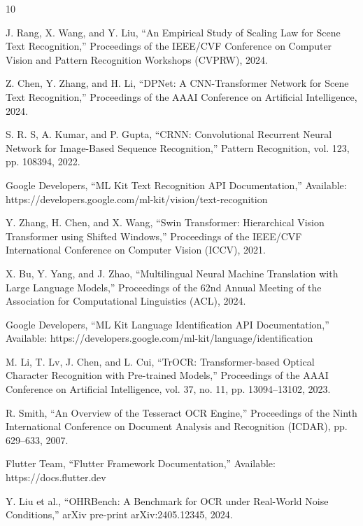 \documentclass[12pt,a4paper]{report}
\begin{document}
\renewcommand{\bibname}{References}
\begin{thebibliography}{10}

J. Rang, X. Wang, and Y. Liu,
``An Empirical Study of Scaling Law for Scene Text Recognition,''
Proceedings of the IEEE/CVF Conference on Computer Vision and
Pattern Recognition Workshops (CVPRW), 2024.

Z. Chen, Y. Zhang, and H. Li,
``DPNet: A CNN-Transformer Network for Scene Text Recognition,''
Proceedings of the AAAI Conference on Artificial Intelligence, 2024.

S. R. S, A. Kumar, and P. Gupta,
``CRNN: Convolutional Recurrent Neural Network for Image-Based Sequence Recognition,''
Pattern Recognition, vol. 123, pp. 108394, 2022.

Google Developers,
``ML Kit Text Recognition API Documentation,''
Available: https://developers.google.com/ml-kit/vision/text-recognition

Y. Zhang, H. Chen, and X. Wang,
``Swin Transformer: Hierarchical Vision Transformer using Shifted Windows,''
Proceedings of the IEEE/CVF International Conference on Computer Vision (ICCV), 2021.

X. Bu, Y. Yang, and J. Zhao,
``Multilingual Neural Machine Translation with Large Language Models,''
Proceedings of the 62nd Annual Meeting of the Association for Computational Linguistics (ACL), 2024.

Google Developers,
``ML Kit Language Identification API Documentation,''
Available: https://developers.google.com/ml-kit/language/identification

M. Li, T. Lv, J. Chen, and L. Cui,
``TrOCR: Transformer-based Optical Character Recognition with Pre-trained Models,''
Proceedings of the AAAI Conference on Artificial Intelligence,
vol. 37, no. 11, pp. 13094--13102, 2023.

R. Smith,
``An Overview of the Tesseract OCR Engine,''
Proceedings of the Ninth International Conference on Document Analysis and Recognition (ICDAR),
pp. 629--633, 2007.

Flutter Team,
``Flutter Framework Documentation,''
Available: https://docs.flutter.dev

Y. Liu et al.,
``OHRBench: A Benchmark for OCR under Real-World Noise Conditions,''
arXiv pre-print arXiv:2405.12345, 2024.

\end{thebibliography}
\end{document}
